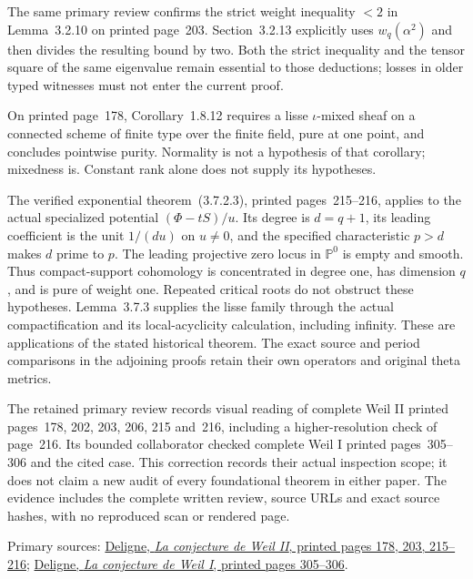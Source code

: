 The same primary review confirms the strict weight inequality $<2$
in Lemma~3.2.10 on printed page~203. Section~3.2.13 explicitly uses
$w_q(\alpha^2)$ and then divides the resulting bound by two.
Both the strict inequality and the tensor square of the same
eigenvalue remain essential to those deductions; losses in older
typed witnesses must not enter the current proof.

On printed page~178, Corollary~1.8.12 requires a lisse
$\iota$-mixed sheaf on a connected scheme of finite type over the
finite field, pure at one point, and concludes pointwise purity.
Normality is not a hypothesis of that corollary; mixedness is.
Constant rank alone does not supply its hypotheses.

The verified exponential theorem~(3.7.2.3), printed pages~215--216,
applies to the actual specialized potential $(\Phi-tS)/u$.
Its degree is $d=q+1$, its leading coefficient is the unit $1/(du)$
on $u\ne0$, and the specified characteristic $p>d$ makes $d$
prime to $p$. The leading projective zero locus in $\mathbb P^0$
is empty and smooth. Thus compact-support cohomology is concentrated
in degree one, has dimension $q$, and is pure of weight one.
Repeated critical roots do not obstruct these hypotheses.
Lemma~3.7.3 supplies the lisse family through the actual compactification
and its local-acyclicity calculation, including infinity.
These are applications of the stated historical theorem. The exact
source and period comparisons in the adjoining proofs retain their
own operators and original theta metrics.

The retained primary review records visual reading of complete
Weil II printed pages~178, 202, 203, 206, 215 and~216, including
a higher-resolution check of page~216. Its bounded collaborator
checked complete Weil I printed pages~305--306 and the cited case.
This correction records their actual inspection scope; it does not
claim a new audit of every foundational theorem in either paper.
The evidence includes the complete written review, source URLs and
exact source hashes, with no reproduced scan or rendered page.

Primary sources:
\href{https://www.numdam.org/item/10.1007/BF02684780.pdf}
{Deligne, \emph{La conjecture de Weil II}, printed pages 178, 203, 215--216};
\href{https://www.numdam.org/item/PMIHES_1974__43__273_0.pdf}
{Deligne, \emph{La conjecture de Weil I}, printed pages 305--306}.


\endgroup

